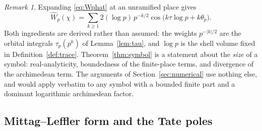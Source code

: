\documentclass[11pt]{amsart}
\theoremstyle{definition}
\theoremstyle{remark}
\newtheorem{remark}[theorem]{Remark}
\newcommand{\Wh}{\widehat{W}}
\begin{document}
\begin{remark}\label{rem:symbolshape}
Expanding \eqref{eq:Wphat} at an unramified place gives
\begin{equation}\label{eq:symbolexp}
\Wh_p(\chi)=\sum_{k\ge1}2(\log p)\,p^{-k/2}
\cos\bigl(k\tau\log p+k\theta_p\bigr).
\end{equation}
Both ingredients are derived rather than assumed: the weights $p^{-|k|/2}$ are
the orbital integrals $\tau_p(p^{k})$ of Lemma~\ref{lem:tau}, and $\log p$ is
the shell volume fixed in Definition~\ref{def:trace}.  Theorem~\ref{thm:symbol}
is a statement about the \emph{size} of a symbol: real-analyticity, boundedness
of the finite-place terms, and divergence of the archimedean term.  The
arguments of Section~\ref{sec:numerical} use nothing else, and would apply
verbatim to any symbol with a bounded finite part and a dominant logarithmic
archimedean factor.
\end{remark}

\subsection{Mittag--Leffler form and the Tate poles}
\end{document}
